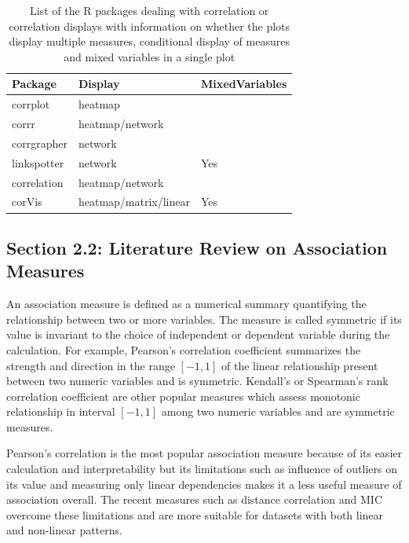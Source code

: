 \begin{Schunk}
\begin{table}

\caption{\label{tab:corrdisplay-packages}List of the R packages dealing with correlation or correlation displays with information on whether the plots display multiple measures, conditional display of measures and mixed variables in a single plot}
\centering
\begin{tabular}[t]{lll}
\toprule
Package & Display & MixedVariables\\
\midrule
corrplot & heatmap & \\
corrr & heatmap/network & \\
corrgrapher & network & \\
linkspotter & network & Yes\\
correlation & heatmap/network & \\
\addlinespace
corVis & heatmap/matrix/linear & Yes\\
\bottomrule
\end{tabular}
\end{table}

\end{Schunk}

\hypertarget{section-2.2-literature-review-on-association-measures}{%
\subsection{Section 2.2: Literature Review on Association
Measures}\label{section-2.2-literature-review-on-association-measures}}

An association measure is defined as a numerical summary quantifying the
relationship between two or more variables. The measure is called
symmetric if its value is invariant to the choice of independent or
dependent variable during the calculation. For example, Pearson's
correlation coefficient summarizes the strength and direction in the
range \([-1,1]\) of the linear relationship present between two numeric
variables and is symmetric. Kendall's or Spearman's rank correlation
coefficient are other popular measures which assess monotonic
relationship in interval \([-1,1]\) among two numeric variables and are
symmetric measures.

Pearson's correlation is the most popular association measure because of
its easier calculation and interpretability but its limitations such as
influence of outliers on its value and measuring only linear
dependencies makes it a less useful measure of association overall. The
recent measures such as distance correlation
\citep{szekely2007measuring} and MIC \citep{reshef2011detecting}
overcome these limitations and are more suitable for datasets with both
linear and non-linear patterns.

